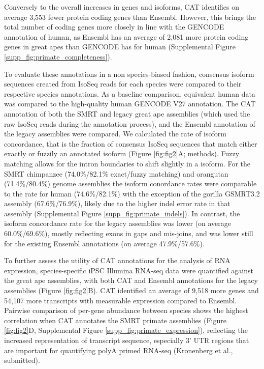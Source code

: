 \documentclass[fleqn,10pt]{wlscirep}
\begin{document}
Conversely to the overall increases in genes and isoforms, CAT identifies on average 3,553 fewer protein coding genes than Ensembl. However, this brings the total number of coding genes more closely in line with the GENCODE annotation of human, as Ensembl has an average of 2,081 more protein coding genes in great apes than GENCODE has for human (Supplemental Figure \ref{supp_fig:primate_completeness}). 

To evaluate these annotations in a non species-biased fashion, consensus isoform sequences created from IsoSeq reads for each species were compared to their respective species annotations. As a baseline comparison, equivalent human data was compared to the high-quality human GENCODE V27 annotation. The CAT annotation of both the SMRT and legacy great ape assemblies (which used the raw IsoSeq reads during the annotation process), and the Ensembl annotation of the legacy assemblies were compared. We calculated the rate of isoform concordance, that is the fraction of consensus IsoSeq sequences that match either exactly or fuzzily an annotated isoform (Figure \ref{fig:fig2}A; methods). Fuzzy matching allows for the intron boundaries to shift slightly in a isoform. For the SMRT chimpanzee (74.0\%/82.1\% exact/fuzzy matching) and orangutan (71.4\%/80.4\%) genome assemblies the isoform conordance rates were comparable to the rate for human (74.6\%/82.1\%) with the exception of the gorilla GSMRT3.2 assembly (67.6\%/76.9\%), likely due to the higher indel error rate in that assembly (Supplemental Figure \ref{supp_fig:primate_indels}). In contrast, the isoform concordance rate for the legacy assemblies was lower (on average 60.0\%/69.6\%), mostly reflecting exons in gaps and mis-joins, and was lower still for the existing Ensembl annotations (on average 47.9\%/57.6\%).

To further assess the utility of CAT annotations for the analysis of RNA expression, species-specific iPSC Illumina RNA-seq data were quantified against the great ape assemblies, with both CAT and Ensembl annotations for the legacy assemblies (Figure \ref{fig:fig2}B). CAT identified an average of 9,518 more genes and 54,107 more transcripts with measurable expression compared to Ensembl. Pairwise comparison of per-gene abundance between species shows the highest correlation when CAT annotates the SMRT primate assemblies (Figure \ref{fig:fig2}D, Supplemental Figure \ref{supp_fig:primate_expression}), reflecting the increased representation of transcript sequence, especially 3' UTR regions that are important for quantifying polyA primed RNA-seq (Kronenberg et al., submitted).
\end{document}
